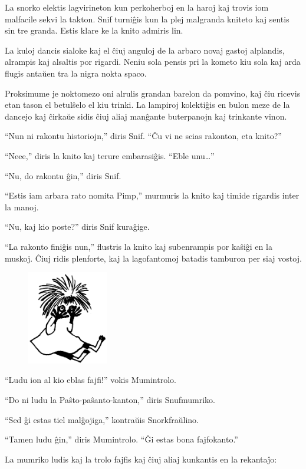 La snorko elektis lagvirineton kun perkoherboj en la haroj kaj trovis iom malfacile sekvi la takton. Snif turniĝis kun la plej malgranda kniteto kaj sentis sin tre granda. Estis klare ke la knito admiris lin.

La kuloj dancis sialoke kaj el ĉiuj anguloj de la arbaro novaj gastoj alplandis, alrampis kaj alsaltis por rigardi. Neniu sola pensis pri la kometo kiu sola kaj arda flugis antaŭen tra la nigra nokta spaco.

Proksimume je noktomezo oni alrulis grandan barelon da pomvino, kaj ĉiu ricevis etan tason el betulŝelo el kiu trinki. La lampiroj kolektiĝis en bulon meze de la dancejo kaj ĉirkaŭe sidis ĉiuj aliaj manĝante buterpanojn kaj trinkante vinon.

``Nun ni rakontu historiojn,'' diris Snif. ``Ĉu vi ne scias rakonton, eta knito?''

``Neee,'' diris la knito kaj terure embarasiĝis. ``Eble unu{\ldots}''

``Nu, do rakontu ĝin,'' diris Snif.

``Estis iam arbara rato nomita Pimp,'' murmuris la knito kaj timide rigardis inter la manoj.

``Nu, kaj kio poste?'' diris Snif kuraĝige.

``La rakonto finiĝis nun,'' flustris la knito kaj subenrampis por kaŝiĝi en la muskoj. Ĉiuj ridis plenforte, kaj la lagofantomoj batadis tamburon per siaj vostoj.

\begin{figure}[htbp]
\centering
\includegraphics[width=100pt,height=116pt]{6-8.png}
\caption{}
\label{6-8}
\end{figure}

``Ludu ion al kio eblas fajfi!'' vokis Mumintrolo.

``Do ni ludu la Paŝto-paŝanto-kanton,'' diris Snufmumriko.

``Sed ĝi estas tiel malĝojiga,'' kontraŭis Snorkfraŭlino.

``Tamen ludu ĝin,'' diris Mumintrolo. ``Ĝi estas bona fajfokanto.''

La mumriko ludis kaj la trolo fajfis kaj ĉiuj aliaj kunkantis en la rekantaĵo:

